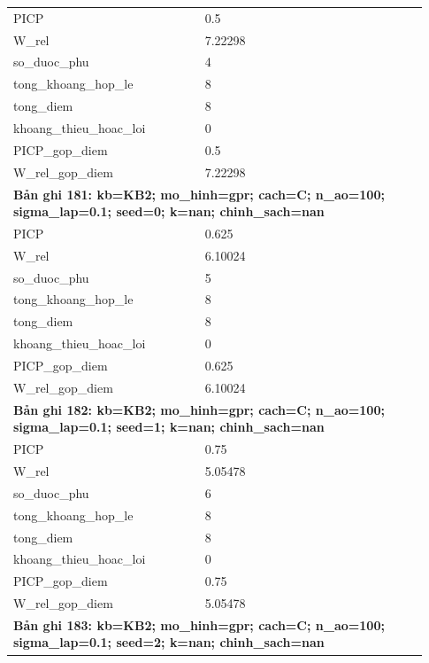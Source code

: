 \begin{longtable}{p{0.43\linewidth}p{0.50\linewidth}}
PICP & 0.5 \\
W\_\allowbreak rel & 7.22298 \\
so\_\allowbreak duoc\_\allowbreak phu & 4 \\
tong\_\allowbreak khoang\_\allowbreak hop\_\allowbreak le & 8 \\
tong\_\allowbreak diem & 8 \\
khoang\_\allowbreak thieu\_\allowbreak hoac\_\allowbreak loi & 0 \\
PICP\_\allowbreak gop\_\allowbreak diem & 0.5 \\
W\_\allowbreak rel\_\allowbreak gop\_\allowbreak diem & 7.22298 \\
\midrule
\multicolumn{2}{p{0.95\linewidth}}{\textbf{Bản ghi 181: kb=KB2; mo\_hinh=gpr; cach=C; n\_ao=100; sigma\_lap=0.1; seed=0; k=nan; chinh\_sach=nan}} \\
PICP & 0.625 \\
W\_\allowbreak rel & 6.10024 \\
so\_\allowbreak duoc\_\allowbreak phu & 5 \\
tong\_\allowbreak khoang\_\allowbreak hop\_\allowbreak le & 8 \\
tong\_\allowbreak diem & 8 \\
khoang\_\allowbreak thieu\_\allowbreak hoac\_\allowbreak loi & 0 \\
PICP\_\allowbreak gop\_\allowbreak diem & 0.625 \\
W\_\allowbreak rel\_\allowbreak gop\_\allowbreak diem & 6.10024 \\
\midrule
\multicolumn{2}{p{0.95\linewidth}}{\textbf{Bản ghi 182: kb=KB2; mo\_hinh=gpr; cach=C; n\_ao=100; sigma\_lap=0.1; seed=1; k=nan; chinh\_sach=nan}} \\
PICP & 0.75 \\
W\_\allowbreak rel & 5.05478 \\
so\_\allowbreak duoc\_\allowbreak phu & 6 \\
tong\_\allowbreak khoang\_\allowbreak hop\_\allowbreak le & 8 \\
tong\_\allowbreak diem & 8 \\
khoang\_\allowbreak thieu\_\allowbreak hoac\_\allowbreak loi & 0 \\
PICP\_\allowbreak gop\_\allowbreak diem & 0.75 \\
W\_\allowbreak rel\_\allowbreak gop\_\allowbreak diem & 5.05478 \\
\midrule
\multicolumn{2}{p{0.95\linewidth}}{\textbf{Bản ghi 183: kb=KB2; mo\_hinh=gpr; cach=C; n\_ao=100; sigma\_lap=0.1; seed=2; k=nan; chinh\_sach=nan}} \\

\end{longtable}
